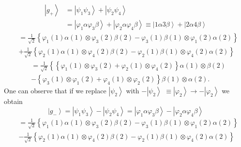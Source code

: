 \documentclass[aps,preprint]{revtex4}%
\begin{document}
\begin{align*}
\left\vert g_{+}\right\rangle  &  =\left\vert \psi_{1}\psi_{3}\right\rangle
+\left\vert \psi_{2}\psi_{4}\right\rangle \\
&  =\left\vert \varphi_{1}\alpha\varphi_{3}\beta\right\rangle +\left\vert
\varphi_{2}\alpha\varphi_{4}\beta\right\rangle \equiv\left\vert 1\alpha
3\beta\right\rangle +\left\vert 2\alpha4\beta\right\rangle
\end{align*}%
\begin{align}
&  =\frac{1}{\sqrt{2}}\left\{  \varphi_{1}\left(  1\right)  \alpha\left(
1\right)  \otimes\varphi_{3}\left(  2\right)  \beta\left(  2\right)
-\varphi_{3}\left(  1\right)  \beta\left(  1\right)  \otimes\varphi_{1}\left(
2\right)  \alpha\left(  2\right)  \right\} \nonumber\\
&  +\frac{1}{\sqrt{2}}\left\{  \varphi_{2}\left(  1\right)  \alpha\left(
1\right)  \otimes\varphi_{4}\left(  2\right)  \beta\left(  2\right)
-\varphi_{2}\left(  1\right)  \beta\left(  1\right)  \otimes\varphi_{4}\left(
2\right)  \alpha\left(  2\right)  \right\} \nonumber
\end{align}%
\begin{align}
&  =\frac{1}{\sqrt{2}}\left\{  \left\{  \varphi_{1}\left(  1\right)
\otimes\varphi_{3}\left(  2\right)  +\varphi_{2}\left(  1\right)
\otimes\varphi_{4}\left(  2\right)  \right\}  \alpha\left(  1\right)
\otimes\beta\left(  2\right)  \right. \nonumber\\
&  -\left\{  \varphi_{3}\left(  1\right)  \otimes\varphi_{1}\left(  2\right)
+\varphi_{4}\left(  1\right)  \otimes\varphi_{2}\left(  2\right)  \right\}
\beta\left(  1\right)  \otimes\alpha\left(  2\right)  .
\end{align}
One can observe that if we replace $\left\vert \psi_{2}\right\rangle $ with
$-\left\vert \psi_{2}\right\rangle $ $\equiv\left\vert \varphi_{2}%
\right\rangle \rightarrow-\left\vert \varphi_{2}\right\rangle $ we obtain
\[
\left\vert g_{-}\right\rangle =\left\vert \psi_{1}\psi_{3}\right\rangle
-\left\vert \psi_{2}\psi_{4}\right\rangle =\left\vert \varphi_{1}\alpha
\varphi_{3}\beta\right\rangle -\left\vert \varphi_{2}\alpha\varphi_{4}%
\beta\right\rangle
\]%
\begin{align}
&  =\frac{1}{\sqrt{2}}\left\{  \varphi_{1}\left(  1\right)  \alpha\left(
1\right)  \otimes\varphi_{3}\left(  2\right)  \beta\left(  2\right)
-\varphi_{3}\left(  1\right)  \beta\left(  1\right)  \otimes\varphi_{1}\left(
2\right)  \alpha\left(  2\right)  \right\} \nonumber\\
&  -\frac{1}{\sqrt{2}}\left\{  \varphi_{2}\left(  1\right)  \alpha\left(
1\right)  \otimes\varphi_{4}\left(  2\right)  \beta\left(  2\right)
-\varphi_{2}\left(  1\right)  \beta\left(  1\right)  \otimes\varphi_{4}\left(
2\right)  \alpha\left(  2\right)  \right\} \nonumber
\end{align}%
\end{document}
